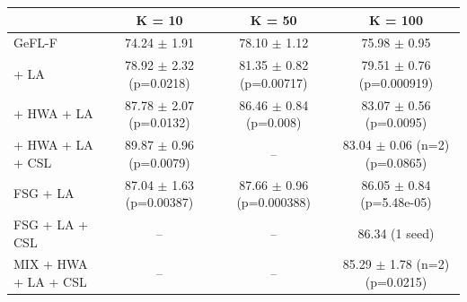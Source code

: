 \begin{tabular}{lccc}
\toprule
 & K = 10 & K = 50 & K = 100 \\
\midrule
GeFL-F & 74.24 $\pm$ 1.91 & 78.10 $\pm$ 1.12 & 75.98 $\pm$ 0.95 \\
+ LA & 78.92 $\pm$ 2.32 (p=0.0218) & 81.35 $\pm$ 0.82 (p=0.00717) & 79.51 $\pm$ 0.76 (p=0.000919) \\
+ HWA + LA & 87.78 $\pm$ 2.07 (p=0.0132) & 86.46 $\pm$ 0.84 (p=0.008) & 83.07 $\pm$ 0.56 (p=0.0095) \\
+ HWA + LA + CSL & 89.87 $\pm$ 0.96 (p=0.0079) & -- & 83.04 $\pm$ 0.06 (n=2) (p=0.0865) \\
FSG + LA & 87.04 $\pm$ 1.63 (p=0.00387) & 87.66 $\pm$ 0.96 (p=0.000388) & 86.05 $\pm$ 0.84 (p=5.48e-05) \\
FSG + LA + CSL & -- & -- & 86.34 (1 seed) \\
MIX + HWA + LA + CSL & -- & -- & 85.29 $\pm$ 1.78 (n=2) (p=0.0215) \\
\bottomrule
\end{tabular}
